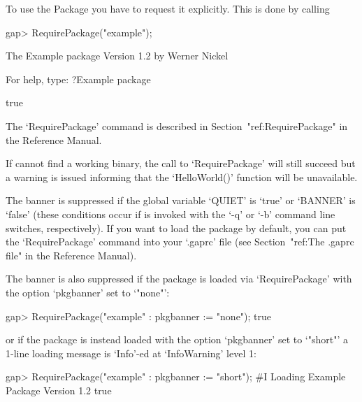 To use the {\Example} Package you have to request it explicitly. This  is
done by calling

\beginexample
gap> RequirePackage("example");

           The Example package
               Version 1.2    
            by Werner Nickel 

     For help, type: ?Example package

true
\endexample

The `RequirePackage' command is described in Section~"ref:RequirePackage"
in the {\GAP} Reference Manual.

If {\GAP} cannot find a working binary, the call to `RequirePackage' will
still succeed but a warning is issued informing that  the  `HelloWorld()'
function will be unavailable.

The banner is suppressed if the global {\GAP} variable `QUIET' is  `true'
or `BANNER' is `false' (these conditions occur if {\GAP} is invoked  with
the `-q' or `-b' command line switches, respectively).  If  you  want  to
load the {\Example} package by default, you can put the  `RequirePackage'
command into your `.gaprc' file (see Section~"ref:The .gaprc file" in the
{\GAP} Reference Manual).

The  banner  is  also  suppressed  if   the   package   is   loaded   via
`RequirePackage' with the option `pkgbanner' set to `"none"':

\beginexample
gap> RequirePackage("example" : pkgbanner := "none");
true
\endexample

or if the package is instead loaded with the option  `pkgbanner'  set  to
`"short"' a 1-line loading message is `Info'-ed at `InfoWarning' level 1:

\begintt
gap> RequirePackage("example" : pkgbanner := "short");
#I  Loading Example Package Version 1.2
true
\endtt

